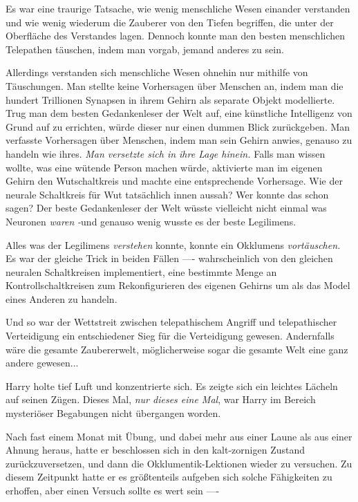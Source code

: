 {Es war eine traurige Tatsache, wie wenig menschliche Wesen einander verstanden und wie wenig wiederum die Zauberer von den Tiefen begriffen, die unter der Oberfläche des Verstandes lagen. Dennoch konnte man den besten menschlichen Telepathen täuschen, indem man vorgab, jemand anderes zu sein.

Allerdings verstanden sich menschliche Wesen ohnehin nur mithilfe von Täuschungen. Man stellte keine Vorhersagen über Menschen an, indem man die hundert Trillionen Synapsen in ihrem Gehirn als separate Objekt modellierte. Trug man dem besten Gedankenleser der Welt auf, eine künstliche Intelligenz von Grund auf zu errichten, würde dieser nur einen dummen Blick zurückgeben. Man verfasste Vorhersagen über Menschen, indem man sein Gehirn anwies, genauso zu handeln wie ihres. \emph{Man versetzte sich in ihre Lage hinein.} Falls man wissen wollte, was eine wütende Person machen würde, aktivierte man im eigenen Gehirn den Wutschaltkreis und machte eine entsprechende Vorhersage. Wie der neurale Schaltkreis für Wut tatsächlich innen aussah? Wer konnte das schon sagen? Der beste Gedankenleser der Welt wüsste vielleicht nicht einmal was Neuronen \emph{waren} \emph{-}und genauso wenig wusste es der beste Legilimens.

Alles was der Legilimens \emph{verstehen} konnte, konnte ein Okklumens \emph{vortäuschen.} Es war der gleiche Trick in beiden Fällen ---- wahrscheinlich von den gleichen neuralen Schaltkreisen implementiert, eine bestimmte Menge an Kontrollschaltkreisen zum Rekonfigurieren des eigenen Gehirns um als das Model eines Anderen zu handeln.

Und so war der Wettstreit zwischen telepathischem Angriff und telepathischer Verteidigung ein entschiedener Sieg für die Verteidigung gewesen. Andernfalls wäre die gesamte Zaubererwelt, möglicherweise sogar die gesamte Welt eine ganz andere gewesen...

Harry holte tief Luft und konzentrierte sich. Es zeigte sich ein leichtes Lächeln auf seinen Zügen. Dieses Mal, \emph{nur dieses eine Mal}, war Harry im Bereich mysteriöser Begabungen nicht übergangen worden.

Nach fast einem Monat mit Übung, und dabei mehr aus einer Laune als aus einer Ahnung heraus, hatte er beschlossen sich in den kalt-zornigen Zustand zurückzuversetzen, und dann die Okklumentik-Lektionen wieder zu versuchen. Zu diesem Zeitpunkt hatte er es größtenteils aufgeben sich solche Fähigkeiten zu erhoffen, aber einen Versuch sollte es wert sein ----

}
